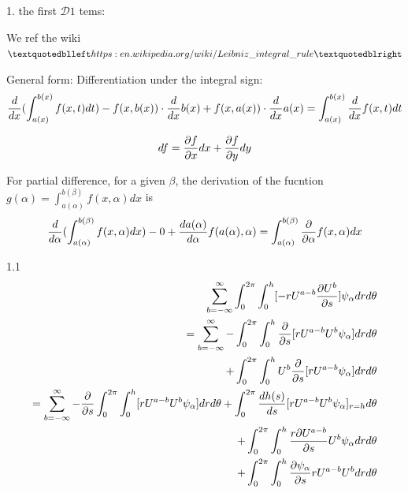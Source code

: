 \documentclass{Note}
\begin{document}
1. the first $\mathcal{D}1$ tems:

We ref the wiki $“https:\\en.wikipedia.org/wiki/Leibniz\_integral\_rule”$  

General form: Differentiation under the integral sign:
\begin{equation}
\begin{aligned}
{d\over dx}(\int_{a(x)}^{b(x)}f(x,t)dt)-f(x,b(x))\cdot {d\over dx}b(x)+f(x,a(x))\cdot {d\over dx}a(x)=\int_{a(x)}^{b(x)}{d\over dx}f(x,t)dt
\end{aligned}
\end{equation}

\begin{equation}
\begin{aligned}
df={\partial f\over \partial x}dx+{\partial f\over \partial y}dy
\end{aligned}
\end{equation}

For partial difference, for a given $\beta$, the derivation of the fucntion
$g(\alpha)=\int_{a(\alpha)}^{b(\beta)}f(x,\alpha)dx$ is
\begin{equation}
\begin{aligned}
{d\over d\alpha}(\int_{a(\alpha)}^{b(\beta)}f(x,\alpha)dx)-0+{da(\alpha)\over d\alpha}f(a(\alpha),\alpha)=\int_{a(\alpha)}^{b(\beta)}{\partial \over \partial \alpha}f(x,\alpha)dx
\end{aligned}
\end{equation}


1.1 
\begin{equation}
\begin{aligned}
\sum_{b=-\infty}^{\infty}\int_0^{2\pi} \int_0^h  [-{r U^{a-b}}  {{\partial U^b} \over {\partial s}}]   \psi_\alpha dr d\theta\\
=\sum_{b=-\infty}^{\infty}-\int_0^{2\pi}\int_0^h   {{\partial }\over {\partial s}}[ {r U^{a-b}} U^b\psi_\alpha] dr d\theta \\
+\int_0^{2\pi}\int_0^h  U^b {{\partial }\over {\partial s}}[ {r U^{a-b}} \psi_\alpha] dr d\theta \\
=\sum_{b=-\infty}^{\infty}-{{\partial }\over {\partial s}}\int_0^{2\pi}\int_0^h   [ {r U^{a-b}} U^b\psi_\alpha] dr d\theta +\int_0^{2\pi} {dh(s)\over ds}[ {r U^{a-b}} U^b\psi_\alpha]_{r=h}d\theta\\
+\int_0^{2\pi}\int_0^h {r{\partial U^{a-b}}\over {\partial s}}   U^b \psi_\alpha dr d\theta \\
+\int_0^{2\pi}\int_0^h   {{\partial \psi_\alpha}\over {\partial s}}{r U^{a-b}U^b} dr d\theta \\
\end{aligned}
\end{equation}
\end{document}
